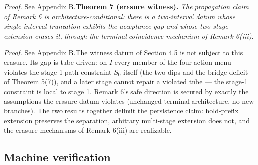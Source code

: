 \documentclass[review,11pt]{elsarticle}
\begin{document}
\emph{Proof.} See Appendix B.\textbf{Theorem 7 (erasure witness).} \emph{The propagation claim of
Remark 6 is architecture-conditional: there is a two-interval datum
whose single-interval truncation exhibits the acceptance gap and whose
two-stage extension erases it, through the terminal-coincidence
mechanism of Remark 6(iii).}

\emph{Proof.} See Appendix B.The witness datum of Section 4.5 is not subject to this erasure. Its gap is
tube-driven: on \(I\) every member of the four-action menu violates the
stage-1 path constraint \(S_0\) itself (the two dips and the bridge
deficit of Theorem 5(7)), and a later stage cannot repair a violated
tube --- the stage-1 constraint is local to stage 1. Remark 6's safe
direction is secured by exactly the assumptions the erasure datum
violates (unchanged terminal architecture, no new branches). The two
results together delimit the persistence claim: hold-prefix extension
preserves the separation, arbitrary multi-stage extension does not, and
the erasure mechanisms of Remark 6(iii) are realizable.

\subsection{Machine verification}\label{machine-verification}
\end{document}
